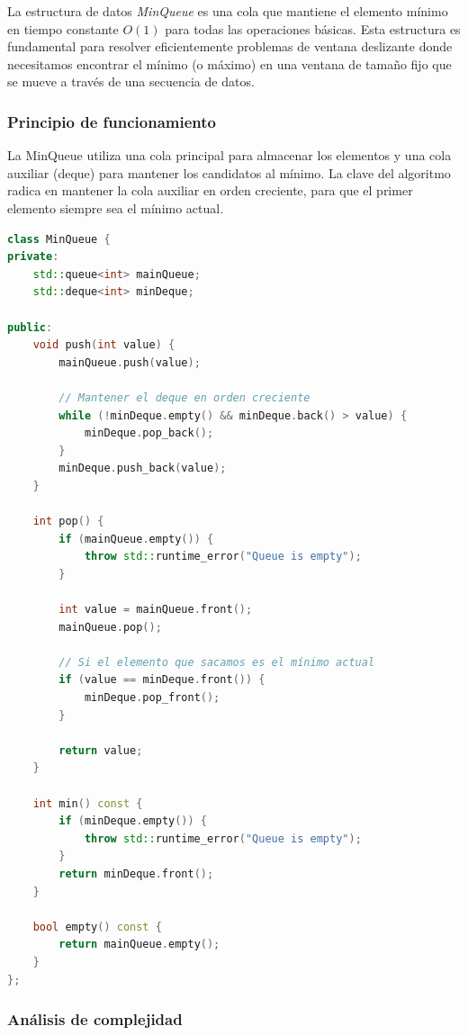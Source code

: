 \documentclass[12pt,a4paper]{article}
\begin{document}
La estructura de datos \textit{MinQueue} es una cola que mantiene el elemento mínimo en tiempo constante $O(1)$ para todas las operaciones básicas. Esta estructura es fundamental para resolver eficientemente problemas de ventana deslizante donde necesitamos encontrar el mínimo (o máximo) en una ventana de tamaño fijo que se mueve a través de una secuencia de datos.

\subsubsection{Principio de funcionamiento}

La MinQueue utiliza una cola principal para almacenar los elementos y una cola auxiliar (deque) para mantener los candidatos al mínimo. La clave del algoritmo radica en mantener la cola auxiliar en orden creciente, para que el primer elemento siempre sea el mínimo actual.

\begin{lstlisting}[language=C++, label=lst:minqueue_simple, caption={MaxMinQueue.hpp - Implementación básica de MinQueue con complejidad O(1) amortizado}]
class MinQueue {
private:
    std::queue<int> mainQueue;
    std::deque<int> minDeque;

public:
    void push(int value) {
        mainQueue.push(value);
        
        // Mantener el deque en orden creciente
        while (!minDeque.empty() && minDeque.back() > value) {
            minDeque.pop_back();
        }
        minDeque.push_back(value);
    }
    
    int pop() {
        if (mainQueue.empty()) {
            throw std::runtime_error("Queue is empty");
        }
        
        int value = mainQueue.front();
        mainQueue.pop();
        
        // Si el elemento que sacamos es el mínimo actual
        if (value == minDeque.front()) {
            minDeque.pop_front();
        }
        
        return value;
    }
    
    int min() const {
        if (minDeque.empty()) {
            throw std::runtime_error("Queue is empty");
        }
        return minDeque.front();
    }
    
    bool empty() const {
        return mainQueue.empty();
    }
};
\end{lstlisting}

\subsubsection{Análisis de complejidad}
\end{document}
